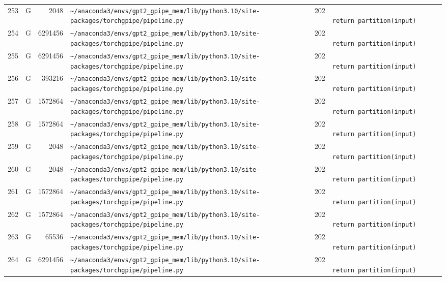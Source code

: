 \documentclass{article}
\begin{document}
\begin{longtable}{r l r p{6.5cm} r p{7.0cm}}
253 & G & 2048 & \lstinline|~/anaconda3/envs/gpt2_gpipe_mem/lib/python3.10/site-packages/torchgpipe/pipeline.py| & 202 & \lstinline|                        return partition(input)| \\
254 & G & 6291456 & \lstinline|~/anaconda3/envs/gpt2_gpipe_mem/lib/python3.10/site-packages/torchgpipe/pipeline.py| & 202 & \lstinline|                        return partition(input)| \\
255 & G & 6291456 & \lstinline|~/anaconda3/envs/gpt2_gpipe_mem/lib/python3.10/site-packages/torchgpipe/pipeline.py| & 202 & \lstinline|                        return partition(input)| \\
256 & G & 393216 & \lstinline|~/anaconda3/envs/gpt2_gpipe_mem/lib/python3.10/site-packages/torchgpipe/pipeline.py| & 202 & \lstinline|                        return partition(input)| \\
257 & G & 1572864 & \lstinline|~/anaconda3/envs/gpt2_gpipe_mem/lib/python3.10/site-packages/torchgpipe/pipeline.py| & 202 & \lstinline|                        return partition(input)| \\
258 & G & 1572864 & \lstinline|~/anaconda3/envs/gpt2_gpipe_mem/lib/python3.10/site-packages/torchgpipe/pipeline.py| & 202 & \lstinline|                        return partition(input)| \\
259 & G & 2048 & \lstinline|~/anaconda3/envs/gpt2_gpipe_mem/lib/python3.10/site-packages/torchgpipe/pipeline.py| & 202 & \lstinline|                        return partition(input)| \\
260 & G & 2048 & \lstinline|~/anaconda3/envs/gpt2_gpipe_mem/lib/python3.10/site-packages/torchgpipe/pipeline.py| & 202 & \lstinline|                        return partition(input)| \\
261 & G & 1572864 & \lstinline|~/anaconda3/envs/gpt2_gpipe_mem/lib/python3.10/site-packages/torchgpipe/pipeline.py| & 202 & \lstinline|                        return partition(input)| \\
262 & G & 1572864 & \lstinline|~/anaconda3/envs/gpt2_gpipe_mem/lib/python3.10/site-packages/torchgpipe/pipeline.py| & 202 & \lstinline|                        return partition(input)| \\
263 & G & 65536 & \lstinline|~/anaconda3/envs/gpt2_gpipe_mem/lib/python3.10/site-packages/torchgpipe/pipeline.py| & 202 & \lstinline|                        return partition(input)| \\
264 & G & 6291456 & \lstinline|~/anaconda3/envs/gpt2_gpipe_mem/lib/python3.10/site-packages/torchgpipe/pipeline.py| & 202 & \lstinline|                        return partition(input)| \\

\end{longtable}
\end{document}
